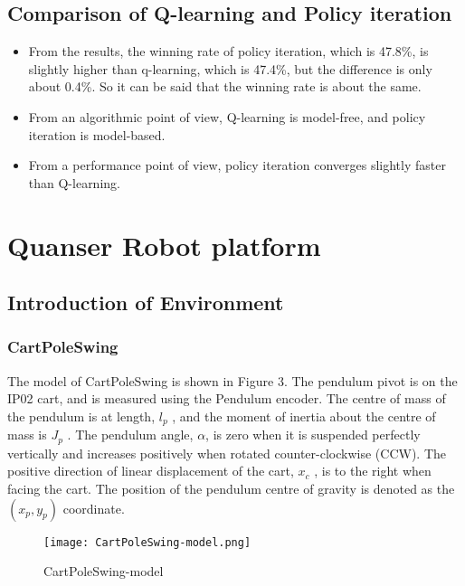 \documentclass[12pt]{article}
\begin{document}
\subsection{Comparison of Q-learning and Policy iteration}

\begin{itemize}
  \item From the results, the winning rate of policy iteration, which is 47.8\%, is slightly higher than q-learning, which is 47.4\%, but the difference is only about 0.4\%. So it can be said that the winning rate is about the same.
  \item From an algorithmic point of view, Q-learning is model-free, and policy iteration is model-based.
  \item From a performance point of view, policy iteration converges slightly faster than Q-learning.
\end{itemize}

\newpage

\section{Quanser Robot platform}

\subsection{Introduction of Environment}
\subsubsection{CartPoleSwing}

The model of CartPoleSwing is shown in Figure 3. The pendulum pivot is on the IP02 cart,
and is measured using the Pendulum encoder. The centre of mass of the pendulum is at length, $l_p$ , and the moment
of inertia about the centre of mass is $J_p$ . The pendulum angle, $\alpha$, is zero when it is suspended perfectly vertically
and increases positively when rotated counter-clockwise (CCW). The positive direction of linear displacement of the
cart, $x_c$ , is to the right when facing the cart. The position of the pendulum centre of gravity is denoted as the $(x_p ,y_p)$ coordinate.
\begin{figure}[H]
  \centering
  \texttt{[image: CartPoleSwing-model.png]}
  \caption{CartPoleSwing-model}
\end{figure}
\end{document}
